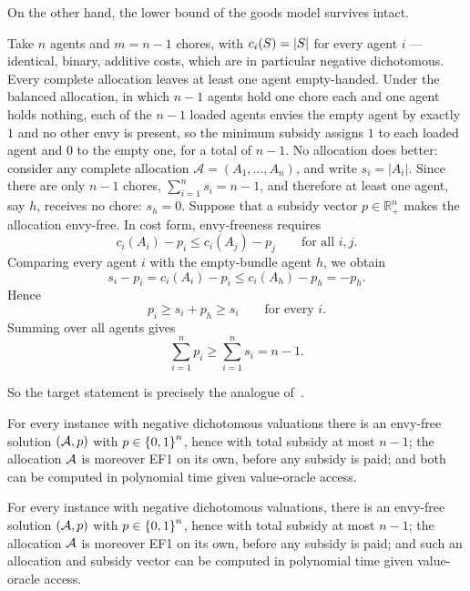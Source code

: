On the other hand, the lower bound of the goods model survives intact.

\begin{example}
\label{ex:lowerbound}
Take $n$ agents and $m = n-1$ chores, with $c_i(S) = \left\lvert S\right\rvert$ for every
agent $i$ --- identical, binary, additive costs, which are in particular
negative dichotomous. Every complete allocation leaves at least one agent
empty-handed. Under the balanced allocation, in which $n-1$ agents hold one
chore each and one agent holds nothing, each of the $n-1$ loaded agents envies
the empty agent by exactly $1$ and no other envy is present, so the minimum
subsidy assigns $1$ to each loaded agent and $0$ to the empty one, for a total of
$n-1$. No allocation does better: consider any complete allocation $\mathcal{A}=(A_1,\ldots,A_n)$, and write $s_i=|A_i|$. Since there are only $n-1$ chores, $\sum_{i=1}^n s_i=n-1$, and therefore at least one agent, say $h$, receives no chore: $s_h=0$. Suppose that a subsidy vector $p\in\mathbb{R}_+^n$ makes the allocation envy-free. In cost form, envy-freeness requires
\[
c_i(A_i)-p_i
\le
c_i(A_j)-p_j
\qquad
\text{for all } i,j.
\]
Comparing every agent $i$ with the empty-bundle agent $h$, we obtain
\[s_i-p_i=c_i(A_i)-p_i\le c_i(A_h)-p_h=-p_h.\]
Hence
\[
p_i\ge s_i+p_h\ge s_i
\qquad
\text{for every } i.
\]
Summing over all agents gives
\[
\sum_{i=1}^n p_i
\ge
\sum_{i=1}^n s_i
=
n-1.
\]
\end{example}

So the target statement is precisely the analogue of~\cite[Theorem~4]{BKNS22}.

\ifworking
\begin{conjecture}
\label{conj:main}
For every instance with negative dichotomous valuations there is an envy-free
solution $(\mathcal{A}, p)$ with $p \in \left\{0,1\right\}^n$, hence with total
subsidy at most $n-1$; the allocation $\mathcal{A}$ is moreover EF1 on its own,
before any subsidy is paid; and both can be computed in polynomial time given
value-oracle access.
\end{conjecture}
\else
\begin{theorem}
\label{conj:main}
For every instance with negative dichotomous valuations, there is an envy-free
solution $(\mathcal{A}, p)$ with $p \in \left\{0,1\right\}^n$, hence with total
subsidy at most $n-1$; the allocation $\mathcal{A}$ is moreover EF1 on its own,
before any subsidy is paid; and such an allocation and subsidy vector can be computed in polynomial time given value-oracle access.
\end{theorem}
\fi

